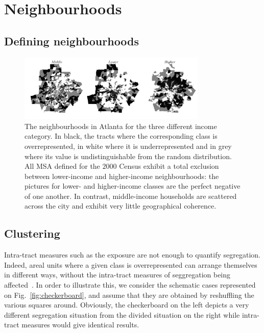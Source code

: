 \section{Neighbourhoods}
\label{sec:neighbourhoods}

\subsection{Defining neighbourhoods}
\label{sub:defining_neighbourhoods}

\begin{figure}[!h]
    \centering
    \includegraphics[width=0.8\textwidth]{./gfx/chapter-segregation/figure2.png}
    \caption{The neighbourhoods in Atlanta for the three different
      income category. In black, the tracts where the corresponding
      class is overrepresented, in white where it is
      underrepresented and in grey where its value is
      undistinguishable from the random distribution. All
      MSA defined for the $2000$ Census exhibit a total exclusion between
      lower-income and higher-income
      neighbourhoods: the pictures for lower- and higher-income classes are the
      perfect negative of one another. In contrast, middle-income households
      are scattered across the city and exhibit very little geographical coherence.}
\label{fig:atlanta_neighbourhoods}
\end{figure}



\subsection{Clustering}
\label{sub:clustering}

Intra-tract measures such as the exposure are not enough to quantify
segregation. Indeed, areal units where a given class is overrepresented can
arrange themselves in different ways, without the intra-tract measures of
seggregation being affected~\cite{White:1983}. In order to illustrate this, we
consider the schematic cases represented on Fig.~\ref{fig:checkerboard}, and
assume that  they are obtained by reshuffling the various squares around.
Obviously, the checkerboard on the left depicts a very different segregation
situation from the divided situation on the right while intra-tract measures
would give identical results.


